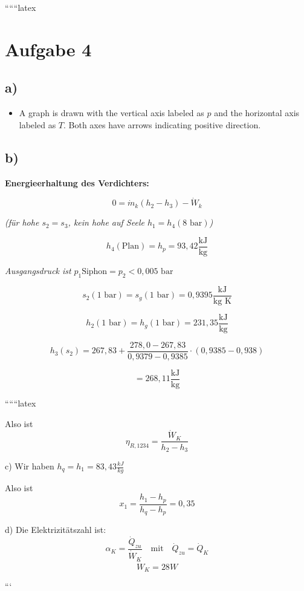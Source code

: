 
``````latex


\section*{Aufgabe 4}

\subsection*{a)}

\begin{itemize}
    \item A graph is drawn with the vertical axis labeled as \( p \) and the horizontal axis labeled as \( T \). Both axes have arrows indicating positive direction.
\end{itemize}

\subsection*{b)}

\textbf{Energieerhaltung des Verdichters:}

\[
0 = \dot{m}_k \left( h_2 - h_3 \right) - \dot{W}_k
\]

\textit{(für hohe \( s_2 = s_3 \), kein hohe auf Seele \( h_1 = h_4 (8 \text{ bar}) \))}

\[
h_4 (\text{Plan}) = h_p = 93,42 \frac{\text{kJ}}{\text{kg}}
\]

\textit{Ausgangsdruck ist} \( p_1 \text{Siphon} = p_2 < 0,005 \text{ bar} \)

\[
s_2 (1 \text{ bar}) = s_g (1 \text{ bar}) = 0,9395 \frac{\text{kJ}}{\text{kg K}}
\]

\[
h_2 (1 \text{ bar}) = h_g (1 \text{ bar}) = 231,35 \frac{\text{kJ}}{\text{kg}}
\]

\[
h_3 (s_2) = 267,83 + \frac{278,0 - 267,83}{0,9379 - 0,9385} \cdot (0,9385 - 0,938)
\]

\[
= 268,11 \frac{\text{kJ}}{\text{kg}}
\]

``````latex


Also ist
\[
\eta_{R,1234} = \frac{\dot{W}_K}{h_2 - h_3}
\]

c) Wir haben $h_q = h_1 = 83,43 \frac{kJ}{kg}$

Also ist
\[
x_1 = \frac{h_1 - h_p}{h_q - h_p} = 0,35
\]

d) Die Elektrizitätszahl ist:
\[
\alpha_K = \frac{\dot{Q}_{zu}}{\dot{W}_K} \quad \text{mit} \quad \dot{Q}_{zu} = \dot{Q}_K
\]
\[
\dot{W}_K = 28 W
\]

```